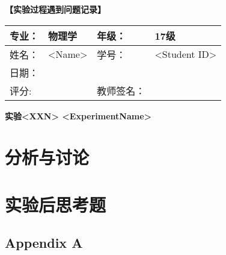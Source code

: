 \documentclass{ctexart}
\numberwithin{equation}{section}%
\newcommand{\ExpTitle}{实验<XXN> <ExperimentName>}
\newcommand{\stuName}{<Name>}
\newcommand{\stuID}{<Student ID>}
\theoremstyle{ansstyle}
\begin{document}

\large{\textbf{【实验过程遇到问题记录】}} %

\newpage

\begin{center}
    \begin{tabular}{|p{2cm}|p{4cm}|p{4cm}|p{4cm}|}
        \hline
        专业： & 物理学 & 年级： & 17级 \\
        \hline
        姓名： & \stuName & 学号： & \stuID \\
        \hline
        日期： &  & & \\
        \hline
        评分:  &   & 教师签名：& \\
        \hline
    \end{tabular}
\end{center}


\begin{center}
    \LARGE{\textbf{\ExpTitle}}
\end{center}



\section{分析与讨论}



\section{实验后思考题}


\begin{appendices}
    \section{Appendix A}
\end{appendices}
\end{document}
